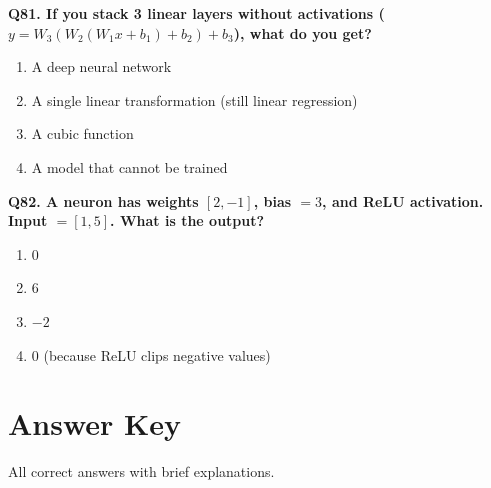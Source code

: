 \documentclass[12pt, a4paper]{article}
\newcommand{\question}[1]{\vspace{0.6em}\noindent\textbf{#1}}
\begin{document}
\question{Q81. If you stack 3 linear layers without activations ($y = W_3(W_2(W_1x + b_1) + b_2) + b_3$), what do you get?}
\begin{enumerate}[label=\alph*)]
    \item A deep neural network
    \item A single linear transformation (still linear regression)
    \item A cubic function
    \item A model that cannot be trained
\end{enumerate}

\question{Q82. A neuron has weights $[2, -1]$, bias $= 3$, and ReLU activation. Input $= [1, 5]$. What is the output?}
\begin{enumerate}[label=\alph*)]
    \item 0
    \item 6
    \item $-2$
    \item 0 (because ReLU clips negative values)
\end{enumerate}

\newpage
\section{Answer Key}

All correct answers with brief explanations.

\vspace{0.5em}

\renewcommand{\arraystretch}{1.25}
\end{document}
